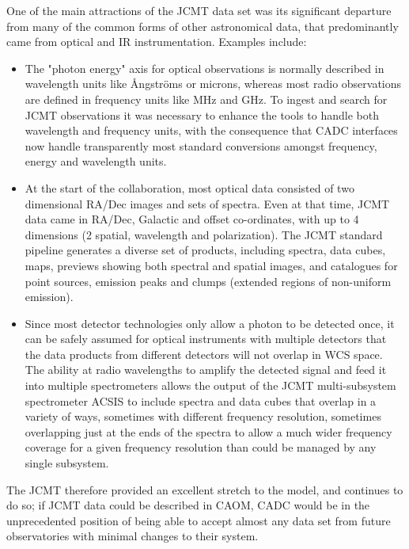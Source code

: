 \documentclass[final,authoryear,5p,times,twocolumn]{elsarticle}
\begin{document}
One of the main attractions of the JCMT data set was its significant
departure from many of the common forms of other astronomical data,
that predominantly came from optical and IR instrumentation.
Examples include:
\begin{itemize}
\item The "photon energy" axis for optical observations is normally described in wavelength
units like \AA{}ngstr\"{o}ms or microns, whereas most radio observations are defined in
frequency units like MHz and GHz.  To ingest and search for JCMT observations
it was necessary to enhance the tools to handle both wavelength and frequency units, with the
consequence that CADC interfaces now handle transparently most standard conversions
amongst frequency, energy and wavelength units.

\item At the start of the collaboration, most optical
data consisted of two dimensional RA/Dec images and sets of spectra.  Even at that time, JCMT data
came in RA/Dec, Galactic and offset co-ordinates, with up to 4 dimensions (2
spatial, wavelength and polarization).  The JCMT standard pipeline generates a
diverse set of products, including spectra, data cubes, maps, previews showing both spectral
and spatial images,  and catalogues for point sources, emission peaks and
clumps (extended regions of non-uniform emission).

\item Since most detector technologies only allow a photon to be
detected once, it can be safely assumed for optical instruments with multiple detectors
that the data products from different detectors will not overlap in WCS space.  The ability
at radio wavelengths to amplify the detected signal and feed it into multiple
spectrometers allows the output of the JCMT multi-subsystem spectrometer ACSIS
to include spectra and data cubes that overlap in a variety of ways, sometimes with
different frequency resolution, sometimes overlapping just at the ends of the spectra
to allow a much wider frequency coverage for a given frequency resolution than could be managed
by any single subsystem.
\end{itemize}

The JCMT therefore
provided an excellent stretch to the model, and continues to do so; if JCMT data could be
described in CAOM, CADC would be in the unprecedented position of
being able to accept almost any data set from future observatories
with minimal changes to their system.
\end{document}
